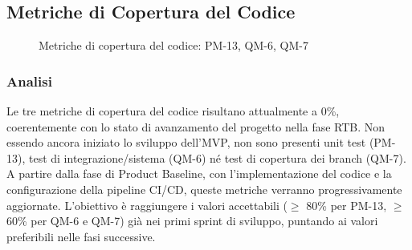 \documentclass[a4paper,11pt,oneside]{scrartcl}
\begin{document}
\subsection{Metriche di Copertura del Codice}

\begin{figure}[H]
\centering


\caption{Metriche di copertura del codice: PM-13, QM-6, QM-7}
\label{fig:copertura_codice}
\end{figure}

\subsubsection*{Analisi}

Le tre metriche di copertura del codice risultano attualmente a 0\%, coerentemente con lo stato di avanzamento del progetto nella fase RTB. Non essendo ancora iniziato lo sviluppo dell'MVP, non sono presenti unit test (PM-13), test di integrazione/sistema (QM-6) né test di copertura dei branch (QM-7). A partire dalla fase di Product Baseline, con l'implementazione del codice e la configurazione della pipeline CI/CD, queste metriche verranno progressivamente aggiornate. L'obiettivo è raggiungere i valori accettabili ($\ge$ 80\% per PM-13, $\ge$ 60\% per QM-6 e QM-7) già nei primi sprint di sviluppo, puntando ai valori preferibili nelle fasi successive.
\end{document}
